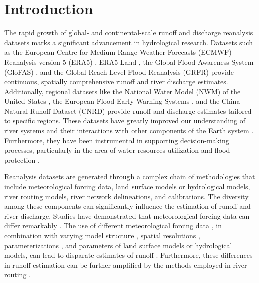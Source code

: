 \documentclass[water,article,submit,pdftex,moreauthors]{Definitions/mdpi}
\begin{document}
\section{Introduction}

The rapid growth of global- and continental-scale runoff and discharge reanalysis datasets marks a significant advancement in hydrological research. Datasets such as the European Centre for Medium-Range Weather Forecasts (ECMWF) Reanalysis version 5 (ERA5) \citep{hersbach2020QJMRS}, ERA5-Land \citep{munoz-sabater2021ESSD}, the Global Flood Awareness System (GloFAS) \citep{alfieri2020JH, harrigan2020ESSD}, and the Global Reach-Level Flood Reanalysis (GRFR) \citep{yang2021BAMS, lin2019WRR} provide continuous, spatially comprehensive runoff and river discharge estimates. Additionally, regional datasets like the National Water Model (NWM) of the United States \citep{cosgrove2024JAWRA}, the European Flood Early Warning Systems \citep{najafi2024NC}, and the China Natural Runoff Dataset (CNRD) \citep{gou2021BAMS, miao2022CSB} provide runoff and discharge estimates tailored to specific regions. These datasets have greatly improved our understanding of river systems \citep{feng2021NC, collins2024NG} and their interactions with other components of the Earth system \citep{liu2024NG}. Furthermore, they have been instrumental in supporting decision-making processes, particularly in the area of water-resources utilization and flood protection \citep{cosgrove2024JAWRA, coughlan_de_perez2016HESS}.

Reanalysis datasets are generated through a complex chain of methodologies that include meteorological forcing data, land surface models or hydrological models, river routing models, river network delineations, and calibrations. The diversity among these components can significantly influence the estimation of runoff and river discharge. Studies have demonstrated that meteorological forcing data can differ remarkably \citep{sun2018RG, henn2018JH}. The use of different meteorological forcing data \citep{renard2010WRR, bai2024JGRA}, in combination with varying model structure \citep{butts2004JH}, spatial resolutions \citep{haddeland2002WRR, barnhart2024WRR, li2022GMD}, parameterizations \citep{zheng2019WRR,zheng2023ESSD}, and parameters \citep{li2020JAMS} of land surface models or hydrological models, can lead to disparate estimates of runoff \citep{saxe2021HESS, beck2017HESS}. Furthermore, these differences in runoff estimation can be further amplified by the methods employed in river routing \citep{fry2014JH, mai2022HESS, ahmed2023JH}.
\end{document}
